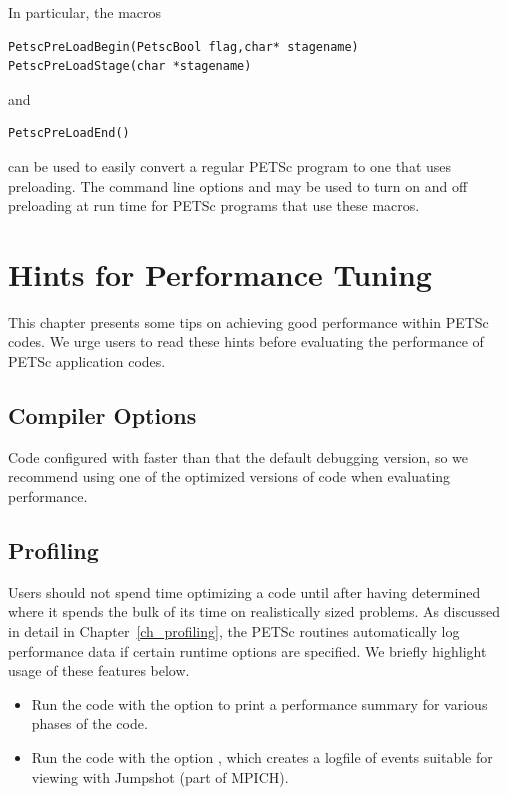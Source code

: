 {{In particular, the macros
\begin{lstlisting}
PetscPreLoadBegin(PetscBool flag,char* stagename)
PetscPreLoadStage(char *stagename)
\end{lstlisting}
and
\begin{lstlisting}
PetscPreLoadEnd()
\end{lstlisting}
can be used to easily
convert a regular PETSc program to one that uses preloading. The command line options
  and   may be used to turn on and off
preloading at run time for PETSc programs that use these macros. 

\cleardoublepage
\chapter{Hints for Performance Tuning}
\label{ch_performance} \hypertarget{ch_performance}{}

This chapter presents some tips on achieving good performance within
PETSc codes.  We urge users to read these hints before
evaluating the performance of PETSc application codes.

\section{Compiler Options}

Code configured with 
faster than that the default debugging version, so we recommend using one
of the optimized versions of code when evaluating performance.

\section{Profiling}
  

Users should not spend time optimizing a code until after having determined
where it spends the bulk of its time on realistically sized problems.
As discussed in detail in Chapter~\ref{ch_profiling}, the PETSc
routines automatically log performance data if certain runtime options
are specified.  We briefly highlight usage of these features below.

\begin{itemize}
\item Run the code with the option  to print a performance
   summary for various phases of the code. 
\item Run the code with the option  \trl{[logfilename]}, which creates a
   logfile of events suitable for viewing with Jumpshot (part of
   MPICH). 
\end{itemize}

}}
